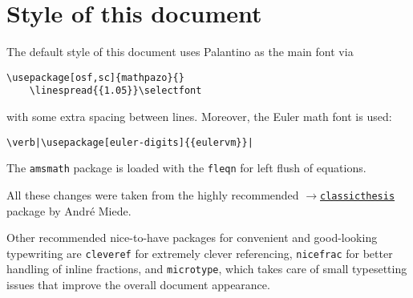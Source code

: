 \section{Style of this document}
The default style of this document uses Palantino as the main font via

\begin{Verbatim}[tabsize=4]
	\usepackage[osf,sc]{mathpazo}{}
	\linespread{{1.05}}\selectfont
\end{Verbatim}

with some extra spacing between lines. Moreover, the Euler math font is used:

\begin{Verbatim}[tabsize=4]
	\verb|\usepackage[euler-digits]{{eulervm}}| 
\end{Verbatim}

The \verb|amsmath| package is loaded with the \verb|fleqn| for left flush of equations. 

All these changes were taken from the highly recommended \href{https://bitbucket.org/amiede/classicthesis/wiki/Home}{$\rightarrow$\texttt{classicthesis}} package by Andr\'e Miede.

Other recommended nice-to-have packages for convenient and good-looking typewriting are \verb|cleveref| for extremely clever referencing, \verb|nicefrac| for better handling of inline fractions, and \verb|microtype|, which takes care of small typesetting issues that improve the overall document appearance.